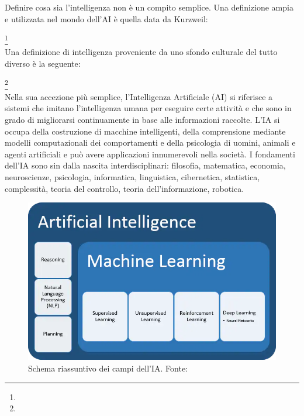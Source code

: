 Definire cosa sia l'intelligenza non è un compito semplice. Una definizione ampia e utilizzata nel mondo dell'AI è quella data da Kurzweil:

\footnote{} \\

Una definizione di intelligenza proveniente da uno sfondo culturale del tutto diverso è la seguente:

\footnote{} \\

Nella sua accezione più semplice, l'Intelligenza Artificiale (AI) si riferisce a sistemi che imitano l'intelligenza umana per eseguire certe attività e che sono in grado di migliorarsi continuamente in base alle informazioni raccolte. L'IA si occupa della costruzione di macchine intelligenti, della comprensione mediante modelli computazionali dei comportamenti e della psicologia di uomini, animali e agenti artificiali e può avere applicazioni innumerevoli nella società. I fondamenti dell'IA sono sin dalla nascita interdisciplinari: filosofia, matematica, economia, neuroscienze, psicologia, informatica, linguistica, cibernetica, statistica, complessità, teoria del controllo, teoria dell'informazione, robotica.

\begin{figure}[!h]
	\centering
	\includegraphics[scale=0.4]{images/artificial-intelligence.png}
	\caption{Schema riassuntivo dei campi dell'IA. Fonte: \cite{ML_IBM}}
	\label{fig:ai}
\end{figure}

